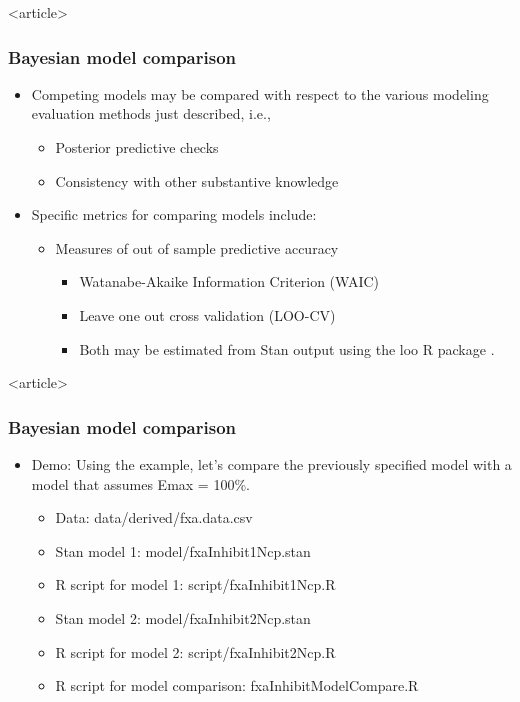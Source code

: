 \documentclass{beamer}
\begin{document}
\begin{frame}<article>
  \frametitle{Bayesian model comparison}
  
  \begin{itemize}
  \item Competing models may be compared with respect to the various
    modeling evaluation methods just described, i.e.,
    \begin{itemize}
    \item Posterior predictive checks
    \item Consistency with other substantive knowledge
    \end{itemize}
  \item Specific metrics for comparing models include:
    \begin{itemize}
    \item Measures of out of sample predictive accuracy \cite[Chapter 7]{gelman2014}
      \begin{itemize}
      \item Watanabe-Akaike Information Criterion (WAIC)
\item Leave one out cross validation (LOO-CV)
\item Both may be estimated from Stan output using the loo R package
  \cite{vehtari2015}.
      \end{itemize}
    \end{itemize}
  \end{itemize}

\end{frame}

\begin{frame}<article>
  \frametitle{Bayesian model comparison}
  
  \begin{itemize}
 \item Demo: Using the example, let's compare the
  previously specified model with a model that assumes Emax = 100\%.
  \begin{itemize}
    \item Data: data/derived/fxa.data.csv
  \item Stan model 1: model/fxaInhibit1Ncp.stan
  \item R script for model 1: script/fxaInhibit1Ncp.R
  \item Stan model 2: model/fxaInhibit2Ncp.stan
  \item R script for model 2: script/fxaInhibit2Ncp.R
\item R script for model comparison: fxaInhibitModelCompare.R
  \end{itemize}
  \end{itemize}

\end{frame}
\end{document}
